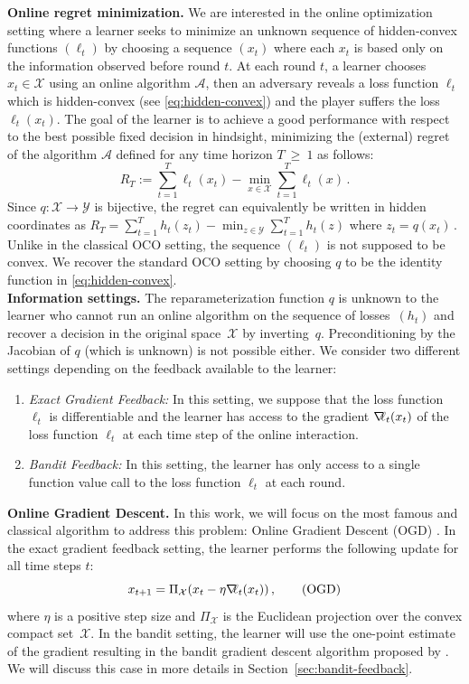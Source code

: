 \documentclass[a4paper,11pt,fullpage]{article}
\def\X{{\mathcal X}}
\def\Y{{\mathcal Y}}
\newcommand{\A}{\mathcal{A}}
\theoremstyle{plain}
\theoremstyle{definition}
\theoremstyle{plain}
\renewcommand{\geq}{~\ge~}
\let\nablaold\nabla
\renewcommand{\nabla}{\nablaold\mkern-2.5mu}
\begin{document}
\noindent\textbf{Online regret minimization.} We are interested in the online optimization setting where a learner seeks to minimize an unknown sequence of hidden-convex functions $(\ell_t)$ by choosing a sequence
$(x_t)$ where each $x_t$ is based only on the information observed before round $t$. 
At each round $t$, a learner chooses $x_t\in \X$ using an online algorithm $\A$, then an adversary reveals a loss function $\ell_t$ which is hidden-convex (see \eqref{eq:hidden-convex}) 
and the player suffers the loss $\ell_t(x_t)$. 
The goal of the learner is to achieve a good performance with respect to the best possible fixed decision in hindsight,  minimizing the (external) regret of the algorithm $\A$ defined for any time horizon $T \geq 1$ as follows:
$$
R_T :=\sum_{t=1}^T \ell_t(x_t)-\min_{x\in \X} \sum_{t=1}^T \ell_t(x)\,.
$$
Since $q:\X\to\Y$ is bijective, the regret can equivalently be written in hidden coordinates as 
$R_T = \sum_{t=1}^T h_t(z_t) - \min_{z\in\Y}\sum_{t=1}^T h_t(z)$ where $z_t = q(x_t)\,.$ 
Unlike in the classical OCO setting, the sequence $(\ell_t)$ is not supposed to be convex. 
We recover the standard OCO setting by choosing $q$ to be the identity function in \eqref{eq:hidden-convex}.\\ 

\noindent\textbf{Information settings.} 
The reparameterization function $q$ is unknown to the learner who cannot run an online algorithm on the sequence of losses~$(h_t)$ and recover a decision in the original space~$\X$ by inverting~$q$. Preconditioning by the Jacobian of $q$ (which is unknown) is not possible either. 
We consider two different settings depending on the feedback available to the learner: 
\begin{enumerate}[label=(\roman*),leftmargin=*]
\item \textit{Exact Gradient Feedback:} In this setting, we suppose that the loss function $\ell_t$ is differentiable and the learner has access to the gradient $\nabla \ell_t(x_t)$ of the loss function $\ell_t$ at each time step of the online interaction. 
\item \textit{Bandit Feedback:} In this setting, the learner has only access to a single function value call to the loss function $\ell_t$ at each round.  
\end{enumerate}

\noindent\textbf{Online Gradient Descent.} In this work, we will focus on the most famous and classical algorithm to address this problem: Online Gradient Descent (OGD) \citep{zinkevich03}. 
In the exact gradient feedback setting, the learner performs the following update for all time steps $t$:
\begin{equation}
x_{t+1} = \Pi_{\X}(x_t - \eta \nabla \ell_t(x_t))\,,
\tag{OGD}
\label{eq:ogd-main}
\end{equation}
where $\eta$ is a positive step size and $\Pi_{\X}$ is the Euclidean projection over the convex compact set~$\X$.  
In the bandit setting, the learner will use the one-point estimate of the gradient resulting in the bandit gradient descent algorithm 
proposed by \citet{flaxman-kalai-mcmahan05}. We will discuss this case in more details in Section~\ref{sec:bandit-feedback}. 
\end{document}
